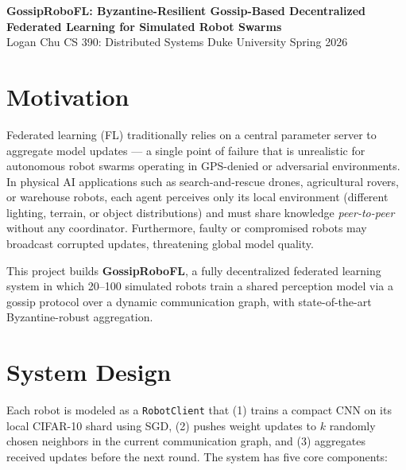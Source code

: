 \documentclass[10pt,letterpaper]{article}
\begin{document}
\begin{center}
  {\large \textbf{GossipRoboFL: Byzantine-Resilient Gossip-Based Decentralized}}\\[2pt]
  {\large \textbf{Federated Learning for Simulated Robot Swarms}}\\[6pt]
  {\normalsize Logan Chu \quad CS 390: Distributed Systems \quad Duke University \quad Spring 2026}
\end{center}

\vspace{-4pt}

\section{Motivation}

Federated learning (FL) traditionally relies on a central parameter server to aggregate model updates — a single point of failure that is unrealistic for autonomous robot swarms operating in GPS-denied or adversarial environments. In physical AI applications such as search-and-rescue drones, agricultural rovers, or warehouse robots, each agent perceives only its local environment (different lighting, terrain, or object distributions) and must share knowledge \emph{peer-to-peer} without any coordinator. Furthermore, faulty or compromised robots may broadcast corrupted updates, threatening global model quality.

This project builds \textbf{GossipRoboFL}, a fully decentralized federated learning system in which 20–100 simulated robots train a shared perception model via a gossip protocol over a dynamic communication graph, with state-of-the-art Byzantine-robust aggregation.

\section{System Design}

Each robot is modeled as a \texttt{RobotClient} that (1) trains a compact CNN on its local CIFAR-10 shard using SGD, (2) pushes weight updates to $k$ randomly chosen neighbors in the current communication graph, and (3) aggregates received updates before the next round. The system has five core components:
\end{document}
